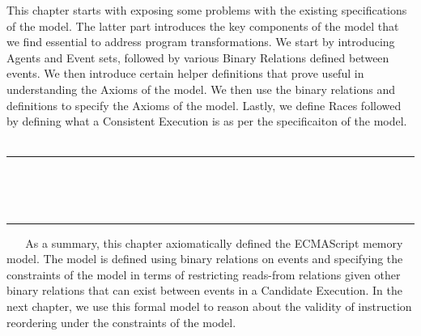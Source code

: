 This chapter starts with exposing some problems with the existing specifications of the model. 
The latter part introduces the key components of the model that we find essential to address program transformations. 
We start by introducing Agents and Event sets, followed by various Binary Relations defined between events. 
We then introduce certain helper definitions that prove useful in understanding the Axioms of the model. 
We then use the binary relations and definitions to specify the Axioms of the model.
Lastly, we define Races followed by defining what a Consistent Execution is as per the specificaiton of the model.  
\ \newline
\ \newline  
\hrule 
\ \newline 
\ \newline 



















\ \newline
\ \newline  
\hrule 
\ \newline 
\ \newline 
As a summary, this chapter axiomatically defined the ECMAScript memory model. 
The model is defined using binary relations on events and specifying the constraints of the model in terms of restricting reads-from relations given other binary relations that can exist between events in a Candidate Execution.
In the next chapter, we use this formal model to reason about the validity of instruction reordering under the constraints of the model.